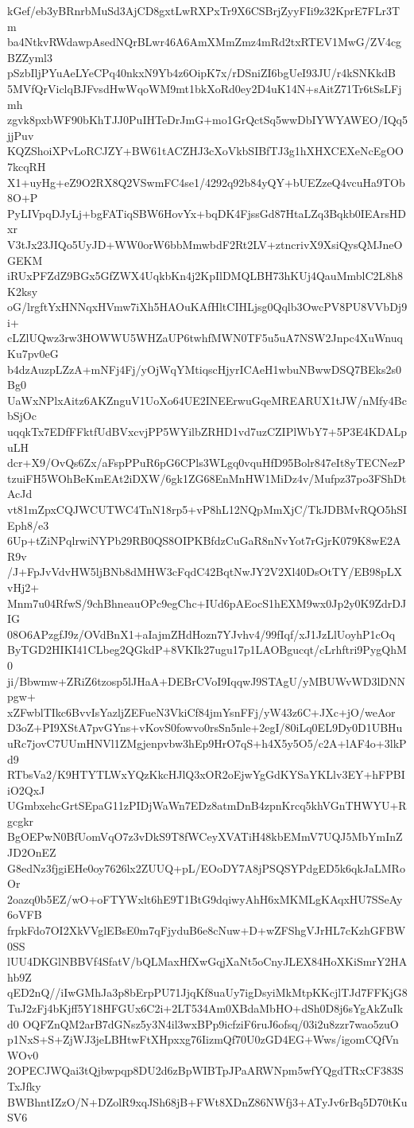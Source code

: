 kGef/eb3yBRnrbMuSd3AjCD8gxtLwRXPxTr9X6CSBrjZyyFIi9z32KprE7FLr3Tm
ba4NtkvRWdawpAsedNQrBLwr46A6AmXMmZmz4mRd2txRTEV1MwG/ZV4cgBZZyml3
pSzbIljPYuAeLYeCPq40nkxN9Yb4z6OipK7x/rDSniZI6bgUeI93JU/r4kSNKkdB
5MVfQrViclqBJFvsdHwWqoWM9mt1bkXoRd0ey2D4uK14N+sAitZ71Tr6tSsLFjmh
zgvk8pxbWF90bKhTJJ0PuIHTeDrJmG+mo1GrQctSq5wwDbIYWYAWEO/IQq5jjPuv
KQZShoiXPvLoRCJZY+BW61tACZHJ3cXoVkbSIBfTJ3g1hXHXCEXeNcEgOO7kcqRH
X1+uyHg+eZ9O2RX8Q2VSwmFC4se1/4292q92b84yQY+bUEZzeQ4vcuHa9TOb8O+P
PyLIVpqDJyLj+bgFATiqSBW6HovYx+bqDK4FjssGd87HtaLZq3Bqkb0IEArsHDxr
V3tJx23JIQo5UyJD+WW0orW6bbMmwbdF2Rt2LV+ztncrivX9XsiQysQMJneOGEKM
iRUxPFZdZ9BGx5GfZWX4UqkbKn4j2KpIlDMQLBH73hKUj4QauMmblC2L8h8K2ksy
oG/lrgftYxHNNqxHVmw7iXh5HAOuKAfHltCIHLjsg0Qqlb3OwcPV8PU8VVbDj9i+
cLZlUQwz3rw3HOWWU5WHZaUP6twhfMWN0TF5u5uA7NSW2Jnpc4XuWnuqKu7pv0eG
b4dzAuzpLZzA+mNFj4Fj/yOjWqYMtiqscHjyrICAeH1wbuNBwwDSQ7BEks2s0Bg0
UaWxNPlxAitz6AKZnguV1UoXo64UE2INEErwuGqeMREARUX1tJW/nMfy4BcbSjOc
uqqkTx7EDfFFktfUdBVxcvjPP5WYilbZRHD1vd7uzCZIPlWbY7+5P3E4KDALpuLH
dcr+X9/OvQs6Zx/aFspPPuR6pG6CPls3WLgq0vquHfD95Bolr847eIt8yTECNezP
tzuiFH5WOhBeKmEAt2iDXW/6gk1ZG68EnMnHW1MiDz4v/Mufpz37po3FShDtAcJd
vt81mZpxCQJWCUTWC4TnN18rp5+vP8hL12NQpMmXjC/TkJDBMvRQO5hSIEph8/e3
6Up+tZiNPqlrwiNYPb29RB0QS8OIPKBfdzCuGaR8nNvYot7rGjrK079K8wE2AR9v
/J+FpJvVdvHW5ljBNb8dMHW3cFqdC42BqtNwJY2V2Xl40DsOtTY/EB98pLXvHj2+
Mnm7u04RfwS/9chBhneauOPc9egChc+IUd6pAEocS1hEXM9wx0Jp2y0K9ZdrDJIG
08O6APzgfJ9z/OVdBnX1+aIajmZHdHozn7YJvhv4/99fIqf/xJ1JzLlUoyhP1cOq
ByTGD2HIKI41CLbeg2QGkdP+8VKIk27ugu17p1LAOBgucqt/cLrhftri9PygQhM0
ji/Bbwmw+ZRiZ6tzosp5lJHaA+DEBrCVoI9IqqwJ9STAgU/yMBUWvWD3lDNNpgw+
xZFwblTIkc6BvvIsYazljZEFueN3VkiCf84jmYsnFFj/yW43z6C+JXc+jO/weAor
D3oZ+PI9XStA7pvGYns+vKovS0fowvo0rsSn5nle+2egI/80iLq0EL9Dy0D1UBHu
uRc7jovC7UUmHNVl1ZMgjenpvbw3hEp9HrO7qS+h4X5y5O5/c2A+lAF4o+3lkPd9
RTbsVa2/K9HTYTLWxYQzKkcHJlQ3xOR2oEjwYgGdKYSaYKLlv3EY+hFPBIiO2QxJ
UGmbxehcGrtSEpaG11zPIDjWaWn7EDz8atmDnB4zpnKrcq5khVGnTHWYU+Rgcgkr
BgOEPwN0BfUomVqO7z3vDkS9T8fWCeyXVATiH48kbEMmV7UQJ5MbYmInZJD2OnEZ
G8edNz3fjgiEHe0oy7626lx2ZUUQ+pL/EOoDY7A8jPSQSYPdgED5k6qkJaLMRoOr
2oazq0b5EZ/wO+oFTYWxlt6hE9T1BtG9dqiwyAhH6xMKMLgKAqxHU7SSeAy6oVFB
frpkFdo7OI2XkVVglEBsE0m7qFjyduB6e8cNuw+D+wZFShgVJrHL7cKzhGFBW0SS
lUU4DKGlNBBVf4SfatV/bQLMaxHfXwGqjXaNt5oCnyJLEX84HoXKiSmrY2HAhb9Z
qED2nQ//iIwGMhJa3p8bErpPU71JjqKf8uaUy7igDsyiMkMtpKKcjlTJd7FFKjG8
TuJ2zFj4bKjff5Y18HFGUx6C2i+2LT534Am0XBdaMbHO+dSh0D8j6sYgAkZuIkd0
OQFZnQM2arB7dGNsz5y3N4il3wxBPp9icfziF6ruJ6ofsq/03i2u8zzr7wao5zuO
p1NxS+S+ZjWJ3jeLBHtwFtXHpxxg76IizmQf70U0zGD4EG+Wws/igomCQfVnWOv0
2OPECJWQai3tQjbwpqp8DU2d6zBpWIBTpJPaARWNpm5wfYQgdTRxCF383STxJfky
BWBhntIZzO/N+DZolR9xqJSh68jB+FWt8XDnZ86NWfj3+ATyJv6rBq5D70tKuSV6
